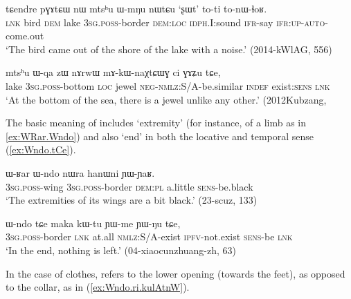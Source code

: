 \begin{exe}
\ex \label{ex:mtshu.WmNu}
\gll   tɕendre pɣɤtɕɯ nɯ mtsʰu ɯ-mŋu nɯtɕu `ʂɯt' to-ti to-nɯ-ɬoʁ.  \\
\textsc{lnk} bird \textsc{dem} lake \textsc{3sg}.\textsc{poss}-border \textsc{dem}:\textsc{loc} \textsc{idph}.I:sound \textsc{ifr}-say \textsc{ifr}:\textsc{up}-\textsc{auto}-come.out \\
\glt  `The bird came out of the shore of the lake with a noise.' (2014-kWlAG, 556)
\end{exe}

\begin{exe}
\ex \label{ex:mtshu.Wqa}
\gll  mtsʰu ɯ-qa zɯ nɤrwɯ mɤ-kɯ-naχtɕɯɣ ci ɣɤʑu tɕe, \\
lake \textsc{3sg}.\textsc{poss}-bottom \textsc{loc} jewel \textsc{neg}-\textsc{nmlz}:S/A-be.similar \textsc{indef} exist:\textsc{sens} \textsc{lnk} \\
\glt `At the bottom of the sea, there is a jewel unlike any other.' (2012Kubzang, 
\end{exe}

The basic meaning of  includes `extremity' (for instance, of a limb as in \ref{ex:WRar.Wndo}) and also `end' in both the locative and temporal sense (\ref{ex:Wndo.tCe}).

\begin{exe}
\ex \label{ex:WRar.Wndo}
\gll ɯ-ʁar ɯ-ndo nɯra hanɯni ɲɯ-ɲaʁ. \\ 
\textsc{3sg}.\textsc{poss}-wing \textsc{3sg}.\textsc{poss}-border \textsc{dem}:\textsc{pl} a.little \textsc{sens}-be.black \\
\glt  `The extremities of its wings are a bit black.' (23-scuz, 133)
\end{exe}

\begin{exe}
\ex \label{ex:Wndo.tCe}
\gll  ɯ-ndo tɕe maka kɯ-tu ɲɯ-me ɲɯ-ŋu tɕe,  \\
\textsc{3sg}.\textsc{poss}-border \textsc{lnk} at.all \textsc{nmlz}:S/A-exist \textsc{ipfv}-not.exist \textsc{sens}-be \textsc{lnk} \\
\glt `In the end, nothing is left.' (04-xiaocunzhuang-zh, 63)
\end{exe}

In the case of clothes,  refers to the lower opening (towards the feet), as opposed to the collar, as in (\ref{ex:Wndo.ri.kulAtnW}).

